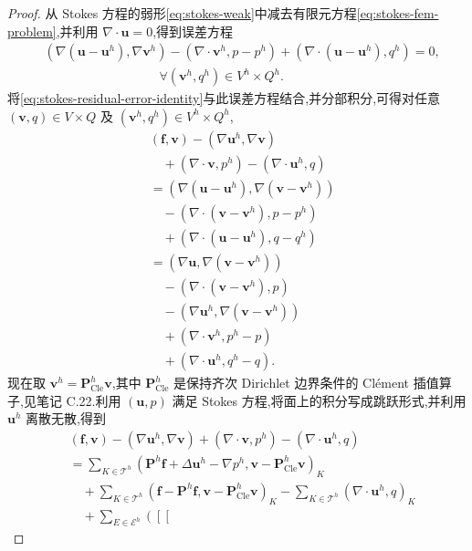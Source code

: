 \begin{proof}
从 Stokes 方程的弱形\cref{eq:stokes-weak}中减去有限元方程\cref{eq:stokes-fem-problem},并利用 $\nabla\cdot\bm{u}=0$,得到误差方程
\[
\begin{aligned}
 &(\nabla(\bm{u}-\bm{u}^h),\nabla\bm{v}^h)
   -(\nabla\cdot\bm{v}^h,p-p^h)
   +(\nabla\cdot(\bm{u}-\bm{u}^h),q^h)=0,
   \\
 &\hspace{9em}\forall(\bm{v}^h,q^h)\in V^h\times Q^h.
\end{aligned}
\]
将\cref{eq:stokes-residual-error-identity}与此误差方程结合,并分部积分,可得对任意 $(\bm{v},q)\in V\times Q$ 及 $(\bm{v}^h,q^h)\in V^h\times Q^h$,
\[
\begin{aligned}
 &(\bm{f},\bm{v})-(\nabla\bm{u}^h,\nabla\bm{v})\\
 &\quad+(\nabla\cdot\bm{v},p^h)-(\nabla\cdot\bm{u}^h,q)\\
 &= (\nabla(\bm{u}-\bm{u}^h),
         \nabla(\bm{v}-\bm{v}^h))\\
 &\quad-(\nabla\cdot(\bm{v}-\bm{v}^h),p-p^h)\\
 &\quad+(\nabla\cdot(\bm{u}-\bm{u}^h),q-q^h)\\
 &= (\nabla\bm{u},\nabla(\bm{v}-\bm{v}^h))
    \\
 &\quad-(\nabla\cdot(\bm{v}-\bm{v}^h),p)\\
 &\quad-(\nabla\bm{u}^h,\nabla(\bm{v}-\bm{v}^h))\\
 &\quad+(\nabla\cdot\bm{v}^h,p^h-p)\\
 &\quad+(\nabla\cdot\bm{u}^h,q^h-q).
\end{aligned}
\]
现在取 $\bm{v}^h=\bm{P}_{\mathrm{Cle}}^h\bm{v}$,其中 $\bm{P}_{\mathrm{Cle}}^h$ 是保持齐次 Dirichlet 边界条件的 Clément 插值算子,见笔记 C.22.利用 $(\bm{u},p)$ 满足 Stokes 方程,将面上的积分写成跳跃形式,并利用 $\bm{u}^h$ 离散无散,得到
\begin{equation}\label{eq:stokes-residual-representation}
\begin{aligned}
 &(\bm{f},\bm{v})-(\nabla\bm{u}^h,\nabla\bm{v})
    +(\nabla\cdot\bm{v},p^h)-(\nabla\cdot\bm{u}^h,q)\\
 &=\sum_{K\in\mathcal{T}^h}
    (\bm{P}^h\bm{f}+\Delta\bm{u}^h-\nabla p^h,
      \bm{v}-\bm{P}_{\mathrm{Cle}}^h\bm{v})_K\\
 &\quad+\sum_{K\in\mathcal{T}^h}
    (\bm{f}-\bm{P}^h\bm{f},
      \bm{v}-\bm{P}_{\mathrm{Cle}}^h\bm{v})_K
    -\sum_{K\in\mathcal{T}^h}(\nabla\cdot\bm{u}^h,q)_K\\
 &\quad+\sum_{E\in\mathcal{E}^h}
    \left(\left[\!\left[

\end{aligned}
\end{equation}
\end{proof}
